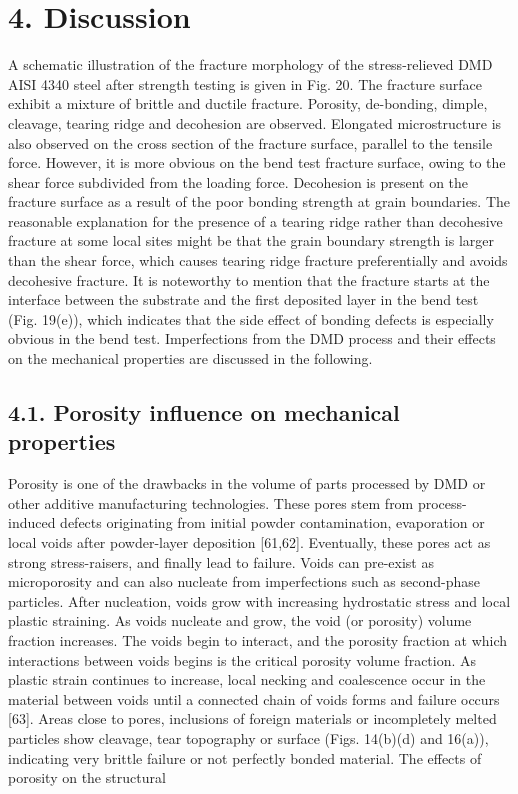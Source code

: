 \documentclass[10pt]{article}
\begin{document}
\section*{4. Discussion}
A schematic illustration of the fracture morphology of the stress-relieved DMD AISI 4340 steel after strength testing is given in Fig. 20. The fracture surface exhibit a mixture of brittle and ductile fracture. Porosity, de-bonding, dimple, cleavage, tearing ridge and decohesion are observed. Elongated microstructure is also observed on the cross section of the fracture surface, parallel to the tensile force. However, it is more obvious on the bend test fracture surface, owing to the shear force subdivided from the loading force. Decohesion is present on the fracture surface as a result of the poor bonding strength at grain boundaries. The reasonable explanation for the presence of a tearing ridge rather than decohesive fracture at some local sites might be that the grain boundary strength is larger than the shear force, which causes tearing ridge fracture preferentially and avoids decohesive fracture. It is noteworthy to mention that the fracture starts at the interface between the substrate and the first deposited layer in the bend test (Fig. 19(e)), which indicates that the side effect of bonding defects is especially obvious in the bend test. Imperfections from the DMD process and their effects on the mechanical properties are discussed in the following.

\subsection*{4.1. Porosity influence on mechanical properties}
Porosity is one of the drawbacks in the volume of parts processed by DMD or other additive manufacturing technologies. These pores stem from process-induced defects originating from initial powder contamination, evaporation or local voids after powder-layer deposition [61,62]. Eventually, these pores act as strong stress-raisers, and finally lead to failure. Voids can pre-exist as microporosity and can also nucleate from imperfections such as second-phase particles. After nucleation, voids grow with increasing hydrostatic stress and local plastic straining. As voids nucleate and grow, the void (or porosity) volume fraction increases. The voids begin to interact, and the porosity fraction at which interactions between voids begins is the critical porosity volume fraction. As plastic strain continues to increase, local necking and coalescence occur in the material between voids until a connected chain of voids forms and failure occurs [63]. Areas close to pores, inclusions of foreign materials or incompletely melted particles show cleavage, tear topography or surface (Figs. 14(b)(d) and 16(a)), indicating very brittle failure or not perfectly bonded material. The effects of porosity on the structural
\end{document}
